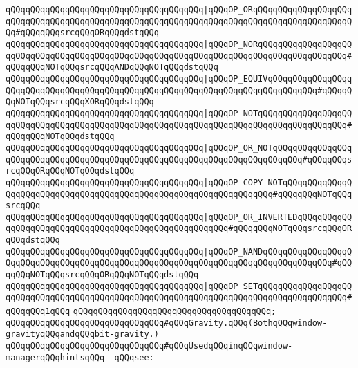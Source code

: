 \verb|qQQqqQQqqQQqqQQqqQQqqQQqqQQqqQQqqQQqqQQq|\verb#|qQQqOP_ORqQQqqQQqqQQqqQQqqQQqqQQqqQQqqQQqqQQqqQQqqQQqqQQqqQQqqQQqqQQqqQQqqQQqqQQqqQQqqQQqqQQqqQQqqQQq#\verb|#qQQqqQQqsrcqQQqORqQQqdstqQQq|\newline
\verb|qQQqqQQqqQQqqQQqqQQqqQQqqQQqqQQqqQQqqQQq|\verb#|qQQqOP_NORqQQqqQQqqQQqqQQqqQQqqQQqqQQqqQQqqQQqqQQqqQQqqQQqqQQqqQQqqQQqqQQqqQQqqQQqqQQqqQQqqQQqqQQq#\verb|#qQQqqQQqNOTqQQqsrcqQQqANDqQQqNOTqQQqdstqQQq|\newline
\verb|qQQqqQQqqQQqqQQqqQQqqQQqqQQqqQQqqQQqqQQq|\verb#|qQQqOP_EQUIVqQQqqQQqqQQqqQQqqQQqqQQqqQQqqQQqqQQqqQQqqQQqqQQqqQQqqQQqqQQqqQQqqQQqqQQqqQQqqQQq#\verb|#qQQqqQQqNOTqQQqsrcqQQqXORqQQqdstqQQq|\newline
\verb|qQQqqQQqqQQqqQQqqQQqqQQqqQQqqQQqqQQqqQQq|\verb#|qQQqOP_NOTqQQqqQQqqQQqqQQqqQQqqQQqqQQqqQQqqQQqqQQqqQQqqQQqqQQqqQQqqQQqqQQqqQQqqQQqqQQqqQQqqQQqqQQq#\verb|#qQQqqQQqNOTqQQqdstqQQq|\newline
\verb|qQQqqQQqqQQqqQQqqQQqqQQqqQQqqQQqqQQqqQQq|\verb#|qQQqOP_OR_NOTqQQqqQQqqQQqqQQqqQQqqQQqqQQqqQQqqQQqqQQqqQQqqQQqqQQqqQQqqQQqqQQqqQQqqQQqqQQq#\verb|#qQQqqQQqsrcqQQqORqQQqNOTqQQqdstqQQq|\newline
\verb|qQQqqQQqqQQqqQQqqQQqqQQqqQQqqQQqqQQqqQQq|\verb#|qQQqOP_COPY_NOTqQQqqQQqqQQqqQQqqQQqqQQqqQQqqQQqqQQqqQQqqQQqqQQqqQQqqQQqqQQqqQQqqQQq#\verb|#qQQqqQQqNOTqQQqsrcqQQq|\newline
\verb|qQQqqQQqqQQqqQQqqQQqqQQqqQQqqQQqqQQqqQQq|\verb#|qQQqOP_OR_INVERTEDqQQqqQQqqQQqqQQqqQQqqQQqqQQqqQQqqQQqqQQqqQQqqQQqqQQqqQQq#\verb|#qQQqqQQqNOTqQQqsrcqQQqORqQQqdstqQQq|\newline
\verb|qQQqqQQqqQQqqQQqqQQqqQQqqQQqqQQqqQQqqQQq|\verb#|qQQqOP_NANDqQQqqQQqqQQqqQQqqQQqqQQqqQQqqQQqqQQqqQQqqQQqqQQqqQQqqQQqqQQqqQQqqQQqqQQqqQQqqQQqqQQq#\verb|#qQQqqQQqNOTqQQqsrcqQQqORqQQqNOTqQQqdstqQQq|\newline
\verb|qQQqqQQqqQQqqQQqqQQqqQQqqQQqqQQqqQQqqQQq|\verb#|qQQqOP_SETqQQqqQQqqQQqqQQqqQQqqQQqqQQqqQQqqQQqqQQqqQQqqQQqqQQqqQQqqQQqqQQqqQQqqQQqqQQqqQQqqQQqqQQq#\verb|#qQQqqQQq1qQQq|\newline
\verb|qQQqqQQqqQQqqQQqqQQqqQQqqQQqqQQqqQQqqQQq;|\newline
\newline
\newline
\verb|qQQqqQQqqQQqqQQqqQQqqQQqqQQqqQQq#qQQqGravity.qQQq(BothqQQqwindow-gravityqQQqandqQQqbit-gravity.)|\newline
\verb|qQQqqQQqqQQqqQQqqQQqqQQqqQQqqQQq#qQQqUsedqQQqinqQQqwindow-managerqQQqhintsqQQq--qQQqsee:|\newline
